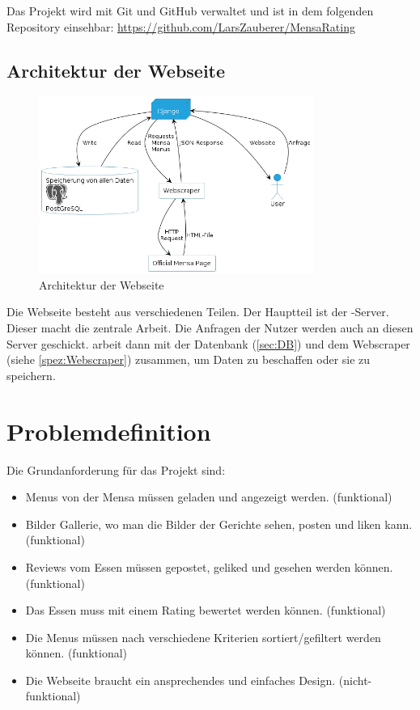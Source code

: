 Das Projekt wird mit Git und GitHub verwaltet und ist in dem folgenden
Repository einsehbar: \url{https://github.com/LarsZauberer/MensaRating}

\newpage

\subsection{Architektur der Webseite}
\begin{figure}[ht]
    \centering
    \includegraphics[width=0.8\textwidth]{images/Webseite.png}
    \caption{Architektur der Webseite}
    \label{fig:Website}
\end{figure}

Die Webseite besteht aus verschiedenen Teilen. Der Hauptteil ist der
-Server. Dieser macht die zentrale Arbeit. Die Anfragen der Nutzer
werden auch an diesen Server geschickt.  arbeit dann mit der
Datenbank (\ref{sec:DB}) und dem Webscraper (siehe \ref{spez:Webscraper})
zusammen, um Daten zu beschaffen oder sie zu speichern.

\newpage

\section{Problemdefinition}\label{sec:problemdefinition}

Die Grundanforderung für das Projekt sind:
\begin{itemize}
    \item Menus von der Mensa müssen geladen und angezeigt werden. (funktional)
    \item Bilder Gallerie, wo man die Bilder der Gerichte sehen, posten und liken kann. (funktional)
    \item Reviews vom Essen müssen gepostet, geliked und gesehen werden können. (funktional)
    \item Das Essen muss mit einem Rating bewertet werden können. (funktional)
    \item Die Menus müssen nach verschiedene Kriterien sortiert/gefiltert werden können. (funktional)
    \item Die Webseite braucht ein ansprechendes und einfaches Design. (nicht-funktional)
\end{itemize}


